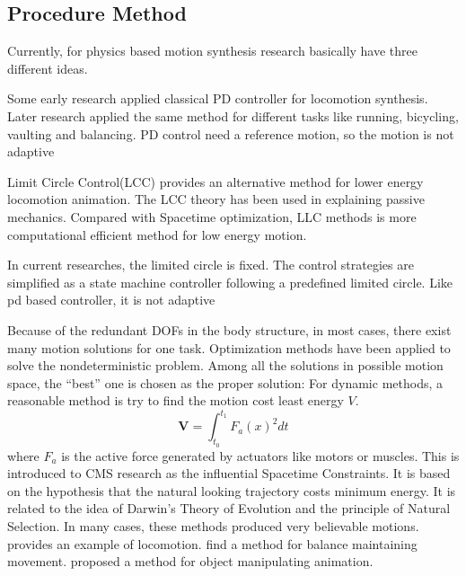\subsection{Procedure Method}
Currently, for physics based motion synthesis research basically have three different ideas.
\begin{itemize}
Some early research applied classical PD controller \citep{Raibert1991} for locomotion synthesis.
Later research \citep{Hodgins1995} applied the same method for different tasks like running, bicycling, vaulting and balancing. 
PD control need a reference motion, so the motion is not adaptive


Limit Circle Control(LCC) \citep{Laszlo1996} provides an alternative method for lower energy locomotion animation. 
The LCC theory has been used in explaining passive mechanics.  
Compared with Spacetime optimization, LLC methods is more computational efficient method for low energy motion.

In current researches\citep{Coros2009,Laszlo1996}, the limited circle is fixed.
The control strategies are simplified as a state machine controller following a predefined limited circle.
Like pd based controller, it is not adaptive



 


Because of the redundant DOFs in the body structure, in most cases, there exist many motion solutions for one task.
Optimization methods have been applied to solve the nondeterministic problem. 
Among all the solutions in possible motion space, the ``best'' one is chosen as the proper solution:
For dynamic methods, a reasonable method is try to find the motion cost least energy $V$. 
\begin{equation}
 \textbf{V}=\int_{t_0}^{t_1}F_{a}(x)^2dt
\end{equation}
where $F_{a}$ is the active force generated by actuators like motors or muscles. 
This is introduced to CMS research as the influential Spacetime Constraints\citep{Witkin1988}. 
It is based on the hypothesis that the natural looking trajectory costs minimum energy. 
It is related to the idea of Darwin's Theory of Evolution and the principle of Natural Selection. 
In many cases, these methods produced very believable motions. 
\citet{Jain2009} provides an example of locomotion.  
\citet{BalanceControl} find a method for balance maintaining movement. 
\citet{Liu2009} proposed a method for object manipulating animation. 
\end{itemize}
